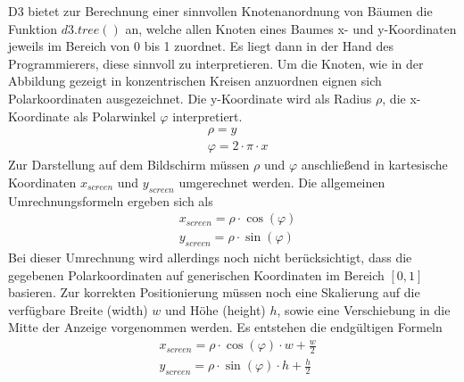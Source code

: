 D3 bietet zur Berechnung einer sinnvollen Knotenanordnung von Bäumen die Funktion $d3.tree()$ an, welche allen Knoten eines Baumes x- und y-Koordinaten jeweils im Bereich von 0 bis 1 zuordnet. Es liegt dann in der Hand des Programmierers, diese sinnvoll zu interpretieren. Um die Knoten, wie in der Abbildung gezeigt in konzentrischen Kreisen anzuordnen eignen sich Polarkoordinaten ausgezeichnet. Die y-Koordinate wird als Radius $\rho$, die x-Koordinate als Polarwinkel $\varphi$ interpretiert.
\begin{align}
&\rho = y\\
&\varphi = 2 \cdot \pi \cdot x
\end{align}
Zur Darstellung auf dem Bildschirm müssen $\rho$ und $\varphi$ anschließend in kartesische Koordinaten $x_{screen}$ und $y_{screen}$ umgerechnet werden. Die allgemeinen Umrechnungsformeln ergeben sich als
\begin{align}
&x_{screen} = \rho \cdot \cos (\varphi)\\
&y_{screen} = \rho \cdot \sin (\varphi)
\end{align}
Bei dieser Umrechnung wird allerdings noch nicht berücksichtigt, dass die gegebenen Polarkoordinaten auf generischen Koordinaten im Bereich $[0,1]$ basieren. Zur korrekten Positionierung müssen noch eine Skalierung auf die verfügbare Breite (width) $w$ und Höhe (height) $h$, sowie eine Verschiebung in die Mitte der Anzeige vorgenommen werden. Es entstehen die endgültigen Formeln
\begin{align}
&x_{screen} = \rho \cdot \cos (\varphi) \cdot w + \frac{w}{2}\\
&y_{screen} = \rho \cdot \sin (\varphi) \cdot h + \frac{h}{2}
\end{align}